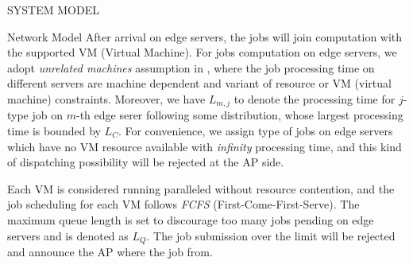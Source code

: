 \documentclass[10pt, conference, letterpaper]{IEEEtran}
\begin{document}
\begin{section}{SYSTEM MODEL}
\begin{subsection}{Network Model}
            After arrival on edge servers, the jobs will join computation with the supported VM (Virtual Machine).
            For jobs computation on edge servers, we adopt \emph{unrelated machines} assumption in \cite{tan-online}, where the job processing time on different servers are machine dependent and variant of resource or VM (virtual machine) constraints.
            Moreover, we have $L_{m,j}$ to denote the processing time for $j$-type job on $m$-th edge serer following some distribution, whose largest processing time is bounded by $L_C$.
            For convenience, we assign type of jobs on edge servers which have no VM resource available with \emph{infinity} processing time, and this kind of dispatching possibility will be rejected at the AP side.

            Each VM is considered running paralleled without resource contention, and the job scheduling for each VM follows \emph{FCFS} (First-Come-First-Serve).
            {\color{red}The maximum queue length is set to discourage too many jobs pending on edge servers and is denoted as $L_Q$. The job submission over the limit will be rejected and announce the AP where the job from.}
        \end{subsection}


\end{section}
\end{document}
